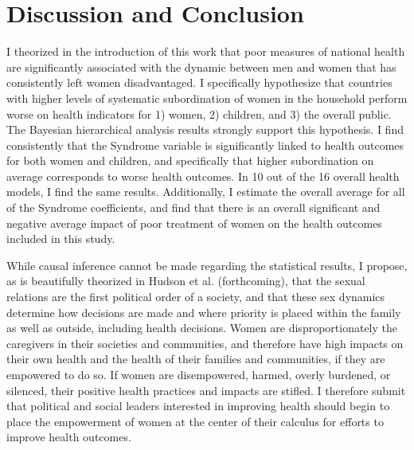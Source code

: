 \section{Discussion and Conclusion}

I theorized in the introduction of this work that poor measures of national health are significantly associated with the dynamic between men and women that has consistently left women disadvantaged. I specifically hypothesize that countries with higher levels of systematic subordination of women in the household perform worse on health indicators for 1) women, 2) children, and 3) the overall public. The Bayesian hierarchical analysis results strongly support this hypothesis. I find consistently that the Syndrome variable is significantly linked to health outcomes for both women and children, and specifically that higher subordination on average corresponds to worse health outcomes. In 10 out of the 16 overall health models, I find the same results. Additionally, I estimate the overall average for all of the Syndrome coefficients, and find that there is an overall significant and negative average impact of poor treatment of women on the health outcomes included in this study.

While causal inference cannot be made regarding the statistical results, I propose, as is beautifully theorized in Hudson et al. (forthcoming), that the sexual relations are the first political order of a society, and that these sex dynamics determine how decisions are made and where priority is placed within the family as well as outside, including health decisions. Women are disproportionately the caregivers in their societies and communities, and therefore have high impacts on their own health and the health of their families and communities, if they are empowered to do so. If women are disempowered, harmed, overly burdened, or silenced, their positive health practices and impacts are stifled. I therefore submit that political and social leaders interested in improving health should begin to place the empowerment of women at the center of their calculus for efforts to improve health outcomes.











